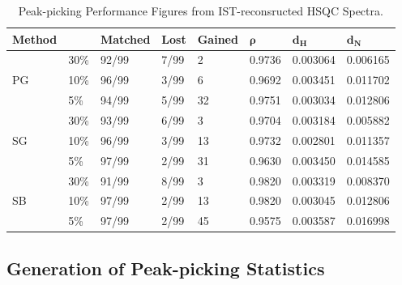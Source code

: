 \begin{table}[h!]
\caption{Peak-picking Performance Figures from IST-reconsructed HSQC Spectra.}
\begin{center}
\begin{tabular}{l l | l l l l l l}
  \hline
  {\bf Method} & & {\bf Matched}       & {\bf Lost}     & {\bf Gained} &
                   $\boldsymbol{\rho}$ & $\mathbf{d_H}$ & $\mathbf{d_N}$ \\
  \hline
     & 30\% & 92/99 & 7/99 &  2 & 0.9736 & 0.003064 & 0.006165 \\
  PG & 10\% & 96/99 & 3/99 &  6 & 0.9692 & 0.003451 & 0.011702 \\
     &  5\% & 94/99 & 5/99 & 32 & 0.9751 & 0.003034 & 0.012806 \\
  \hline
     & 30\% & 93/99 & 6/99 &  3 & 0.9704 & 0.003184 & 0.005882 \\
  SG & 10\% & 96/99 & 3/99 & 13 & 0.9732 & 0.002801 & 0.011357 \\
     &  5\% & 97/99 & 2/99 & 31 & 0.9630 & 0.003450 & 0.014585 \\
  \hline
     & 30\% & 91/99 & 8/99 &  3 & 0.9820 & 0.003319 & 0.008370 \\
  SB & 10\% & 97/99 & 2/99 & 13 & 0.9820 & 0.003045 & 0.012806 \\
     &  5\% & 97/99 & 2/99 & 45 & 0.9575 & 0.003587 & 0.016998 \\
\end{tabular}
\end{center}
\end{table}

\subsection{Generation of Peak-picking Statistics}

